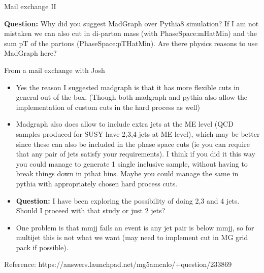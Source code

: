 \documentclass[8pt]{beamer}
\begin{document}
\begin{frame}{Mail exchange II}

\textbf{Question:} Why did you suggest MadGraph over Pythia8 simulation? If I am not mistaken we can also cut in di-parton mass (with PhaseSpace:mHatMin) and the sum pT of the partons (PhaseSpace:pTHatMin). Are there physics reasons to use MadGraph here? 

\begin{block}{From a mail exchange with Josh}

\begin{itemize}
  \item Yes the reason I suggested madgraph is that it has more flexible cuts in general out of the box.  (Though both madgraph and pythia also allow the implementation of custom cuts in the hard process as well)
  \item Madgraph also does allow to include extra jets at the ME level (QCD samples produced for SUSY have 2,3,4 jets at ME level), which may be better since these can also be included in the phase space cuts (ie you can require that any pair of jets satisfy your requirements).  I think if you did it this way you could manage to generate 1 single inclusive sample, without having to break things down in pthat bins.  Maybe you could manage the same in pythia with appropriately chosen hard process cuts.
\end{itemize}

\end{block}

\begin{itemize}
  \item \textbf{Question:} I have been exploring the possibility of doing 2,3 and 4 jets. Should I proceed with that study or just 2 jets? 
  \item One problem is that mmjj fails an event is any jet pair is below mmjj, so for multijet this is not what we want (may need to implement cut in MG grid pack if possible).
\end{itemize}

Reference: https://answers.launchpad.net/mg5amcnlo/+question/233869

\end{frame}
\end{document}
